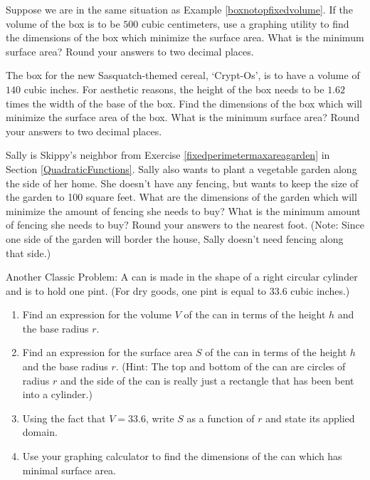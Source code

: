 \begin{exenum}
\item  Suppose we are in the same situation as Example \ref{boxnotopfixedvolume}.  If the volume of the box is to be $500$ cubic centimeters, use a graphing utility to find the dimensions of the box which minimize the surface area.  What is the minimum surface area?  Round your answers to two decimal places.

\item  The box for the new Sasquatch-themed cereal, `Crypt-Os', is to have a volume of $140$ cubic inches.  For aesthetic reasons, the height of the box needs to be $1.62$ times the width of the base of the box.  Find the dimensions of the box which will minimize the surface area of the box.  What is the minimum surface area?  Round your answers to two decimal places.   

\item \label{fixedareaminperimetergarden} Sally is Skippy's neighbor from Exercise \ref{fixedperimetermaxareagarden} in Section \ref{QuadraticFunctions}.   Sally also wants to plant a vegetable garden along the side of her home.  She doesn't have any fencing, but wants to keep the size of the garden to 100 square feet.  What are the dimensions of the garden which will minimize the amount of fencing she needs to buy?  What is the minimum amount of fencing she needs to buy? Round your answers to the nearest foot. (Note:  Since one side of the garden will border the house, Sally doesn't need fencing along that side.)

\item Another Classic Problem: A can is made in the shape of a right circular cylinder and is to hold one pint. (For dry goods, one pint is equal to $33.6$ cubic inches.)  

\begin{enumerate}

\item Find an expression for the volume $V$ of the can in terms of the height $h$ and the base radius $r$.
\item Find an expression for the surface area $S$ of the can in terms of the height $h$ and the base radius $r$.  (Hint: The top and bottom of the can are circles of radius $r$ and the side of the can is really just a rectangle that has been bent into a cylinder.)
\item Using the fact that $V = 33.6$, write $S$ as a function of $r$ and state its applied domain.
\item Use your graphing calculator to find the dimensions of the can which has minimal surface area.


\end{enumerate}
\end{exenum}
